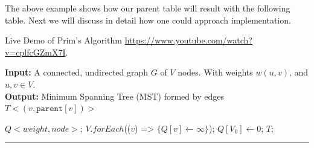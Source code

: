 \noindent 
The above example shows how our parent table will result with the following table. Next we will discuss in detail how one could approach implementation.

\newpage
\begin{Tip}
    Live Demo of Prim's Algorithm \url{https://www.youtube.com/watch?v=cplfcGZmX7I}.
\end{Tip}

\vspace{-1em}
\begin{Func}
    \textbf{Input:} A connected, undirected graph \( G\) of $V$ nodes. With weights \( w(u, v) \), and $u,v\in V$.\\
    \textbf{Output:} Minimum Spanning Tree (MST) formed by edges \( T<(v, \texttt{parent}[v])> \)\\

    \vspace{-.5em}
    \begin{algorithm}[H]
        \label{algo:prim}
        $Q<weight, node>$; 
        $V.forEach$(($v$) => $\{Q[v]\gets \infty\}$); 
        $Q[V_0]\gets 0$; 
        $T$; 
        
        \vspace{.5em}
    \end{algorithm}
    \noindent\rule{\textwidth}{0.4pt}


\end{Func}
